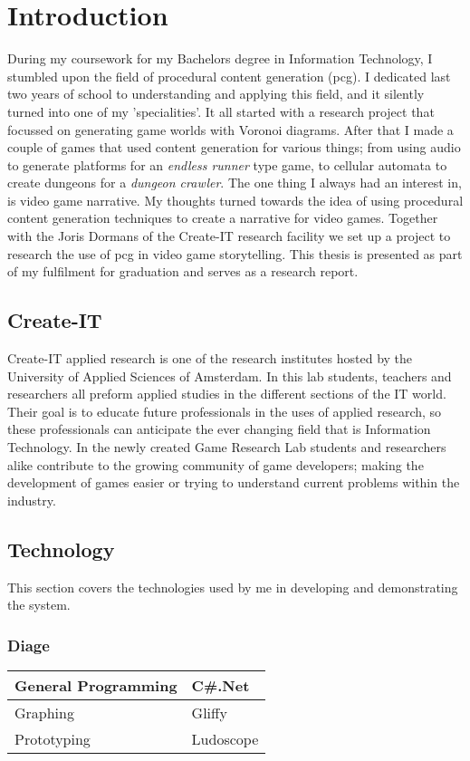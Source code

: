 \chapter{Introduction}
During my coursework for my Bachelors degree in Information Technology, I stumbled upon the field of procedural content generation (pcg). I dedicated last two years of school to understanding and applying this field, and it silently turned into one of my 'specialities'. It all started with a research project that focussed on generating game worlds with Voronoi diagrams. After that I made a couple of games that used content generation for various things; from using audio to generate platforms for an \textit{endless runner} type game, to cellular automata to create dungeons for a \textit{dungeon crawler}.
The one thing I always had an interest in, is video game narrative. My thoughts turned towards the idea of using procedural content generation techniques to create a narrative for video games. Together with the Joris Dormans of the Create-IT research facility we set up a project to research the use of pcg in video game storytelling. This thesis is presented as part of my fulfilment for graduation and serves as a research report.

\section{Create-IT}
Create-IT applied research is one of the research institutes hosted by the University of Applied Sciences of Amsterdam. In this lab students, teachers and researchers all preform applied studies in the different sections of the IT world. Their goal is to educate future professionals in the uses of applied research, so these professionals can anticipate the ever changing field that is Information Technology.
In the newly created Game Research Lab students and researchers alike contribute to the growing community of game developers; making the development of games easier or trying to understand current problems within the industry.

\section{Technology}
This section covers the technologies used by me in developing and demonstrating the \diage system.

\subsection{Diage}
\begin{tabular}{|l|l|}
	\hline
	General Programming & C\#.Net \\
	\hline
	Graphing & Gliffy\\
	\hline
	Prototyping & Ludoscope\\
	\hline
\end{tabular}

